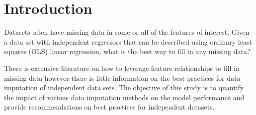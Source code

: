 \documentclass[../paper.tex]{subfiles}
\begin{document}
\section{Introduction}
Datasets often have missing data in some or all of the features of interest.
Given a data set with independent regressors that can be described using ordinary
least squares (OLS) linear regression, what is the best way to fill in any missing data?

There is extensive literature on how to leverage feature relationships
to fill in missing data however there is little information on the best practices
for data imputation of independent data sets.
The objective of this study is to quantify the impact of various data
imputation methods on the model performance and provide recommendations on best
practices for independent datasets.
\end{document}
